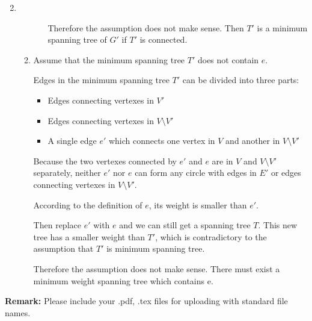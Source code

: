 \documentclass[12pt,a4paper]{article}
\makeatletter
\newtheorem*{solution}{Solution}
\theoremstyle{definition}
\renewenvironment{solution}[1][Solution] {\par\pushQED{\qed}\normalfont\topsep6\p@\@plus6\p@\relax\trivlist\item[\hskip\labelsep\bfseries#1\@addpunct{.}]\ignorespaces}{\popQED\endtrivlist\@endpefalse} \makeatother
\makeatother
\begin{document}
\begin{enumerate}
\begin{solution}
\begin{enumerate}
\begin{itemize}
    			    Therefore the assumption does not make sense. Then $T'$ is a minimum spanning tree of $G'$ if $T'$ is connected.
    			
    			    
    		\end{itemize}
    		\item 
    		    Assume that the minimum spanning tree $T'$ does not contain $e$.
    		    
    		    Edges in the minimum spanning tree $T'$ can be divided into three parts:
    		    \begin{itemize}
    		    	\item Edges connecting vertexes in $V'$
    		    	\item Edges connecting vertexes in $V \setminus V'$
    		    	\item A single edge $e'$ which connects one vertex in $V$ and another in $V \setminus V'$
    		    \end{itemize}    
    	        Because the two vertexes connected by $e'$ and $e$ are in $V$ and $V \setminus V'$ separately, neither $e'$ nor $e$ can form any circle with edges in $E'$ or edges connecting vertexes in $V \setminus V'$. 
    	        
    	        According to the definition of $e$, its weight is smaller than $e'$.
    	        
    	        Then replace $e'$ with $e$ and we can still get a spanning tree $T$. This new tree has a smaller weight than $T'$, which is contradictory to the assumption that $T'$ is minimum spanning tree.
    	        
    	        Therefore the assumption does not make sense. There must exist a minimum weight spanning tree which contains e.
    	\end{enumerate}
    \end{solution}
\end{enumerate}



\textbf{Remark:} Please include your .pdf, .tex files for uploading with standard file names.


\end{document}
